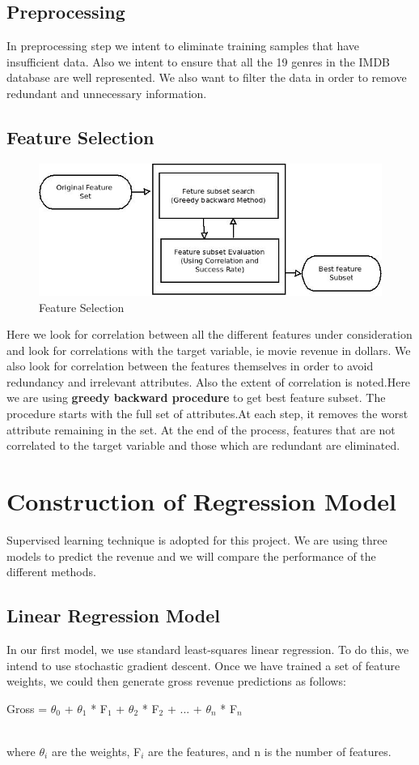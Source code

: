 \subsection{Preprocessing}


In preprocessing step we intent to eliminate training samples that have insufficient data. Also we intent to ensure that all the 19 genres in the IMDB database are well represented. We also want to filter the data in order to remove redundant and unnecessary information.
\subsection{Feature Selection}
\begin{figure}[htb!]
  \centering
      \includegraphics[scale=0.55]{featureselection.jpeg}
  \caption{Feature Selection}
\end{figure}
Here we look for correlation between all the different features under consideration and look for correlations with the target variable, ie movie revenue in dollars. We also look for correlation between the features themselves in order to avoid redundancy and irrelevant attributes. Also the extent of correlation is noted.Here we are using {\bf greedy 
backward procedure} to get best feature subset. The procedure starts with the
 full set of attributes.At each step, it removes the worst attribute remaining in the set.
At the end of the process, features that are not correlated to the target variable and those which are redundant are eliminated.

\section{Construction of Regression Model}
Supervised learning technique is adopted for this project.
We are using three models to predict the revenue and we will compare the performance of the different methods.




\subsection{Linear Regression Model}
In our first model, we use standard least-squares linear regression. To do this, we intend to use stochastic gradient descent. Once we have trained a set of feature weights, we could then generate gross revenue predictions as follows:
\centerline{ Gross = $\theta_{0}$ + $\theta_{1}$ * F$_1$ + $\theta_{2}$ * F$_2$ + ... + $\theta_{n}$ * F$_n$}\\	
where $\theta_i$ are the weights, F$_i$ are the features, and n is the number of features.\\
